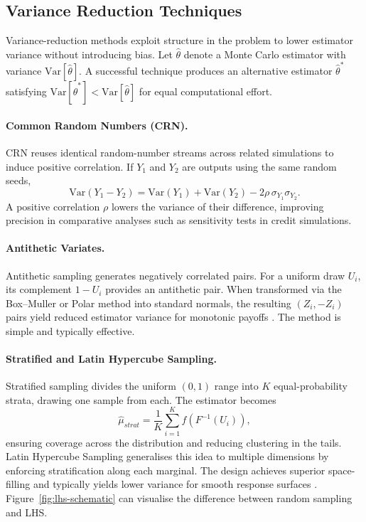 \subsection{Variance Reduction Techniques}

Variance-reduction methods exploit structure in the problem to lower estimator variance without introducing bias. Let $\hat{\theta}$ denote a Monte Carlo estimator with variance $\mathrm{Var}[\hat{\theta}]$. A successful technique produces an alternative estimator $\hat{\theta}^{*}$ satisfying $\mathrm{Var}[\hat{\theta}^{*}] < \mathrm{Var}[\hat{\theta}]$ for equal computational effort.

\paragraph{Common Random Numbers (CRN).}
CRN reuses identical random-number streams across related simulations to induce positive correlation. If $Y_1$ and $Y_2$ are outputs using the same random seeds,
\[\mathrm{Var}(Y_1 - Y_2) = \mathrm{Var}(Y_1) + \mathrm{Var}(Y_2) - 2\rho\,\sigma_{Y_1}\sigma_{Y_2}.\]
A positive correlation $\rho$ lowers the variance of their difference, improving precision in comparative analyses such as sensitivity tests in credit simulations.

\paragraph{Antithetic Variates.}
Antithetic sampling generates negatively correlated pairs. For a uniform draw $U_i$, its complement $1-U_i$ provides an antithetic pair. When transformed via the Box–Muller or Polar method into standard normals, the resulting $(Z_i, -Z_i)$ pairs yield reduced estimator variance for monotonic payoffs \citep{glasserman2004}. The method is simple and typically effective.

\paragraph{Stratified and Latin Hypercube Sampling.}
Stratified sampling divides the uniform $(0,1)$ range into $K$ equal-probability strata, drawing one sample from each. The estimator becomes
\[\hat{\mu}_{strat} = \frac{1}{K}\sum_{i=1}^{K} f(F^{-1}(U_i)),\]
ensuring coverage across the distribution and reducing clustering in the tails. Latin Hypercube Sampling generalises this idea to multiple dimensions by enforcing stratification along each marginal. The design achieves superior space-filling and typically yields lower variance for smooth response surfaces \citep{lawKelton2015}. Figure~\ref{fig:lhs-schematic} can visualise the difference between random sampling and LHS.

